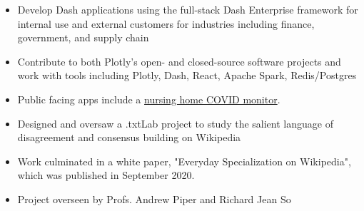 \documentclass[10pt,ragged2e]{altacv}
\begin{document}
\tagline{}

\begin{fullwidth}
\makecvheader
\end{fullwidth}



\begin{itemize}
\item Develop Dash applications using the full-stack Dash Enterprise framework for internal use and external customers for industries including finance, government, and supply chain
\item Contribute to both Plotly's open- and closed-source software projects and work with tools including Plotly, Dash, React, Apache Spark, Redis/Postgres
\item Public facing apps include a {\href{https://tylertech.plotly.com/}{nursing home COVID monitor}}.

\end{itemize}

\divider

\begin{itemize}
\item Designed and oversaw a .txtLab project to study the salient language of disagreement and consensus building on Wikipedia
\item Work culminated in a white paper, "Everyday Specialization on Wikipedia", which was published in September 2020.
\item Project overseen by Profs. Andrew Piper and Richard Jean So
\end{itemize}
\end{document}
